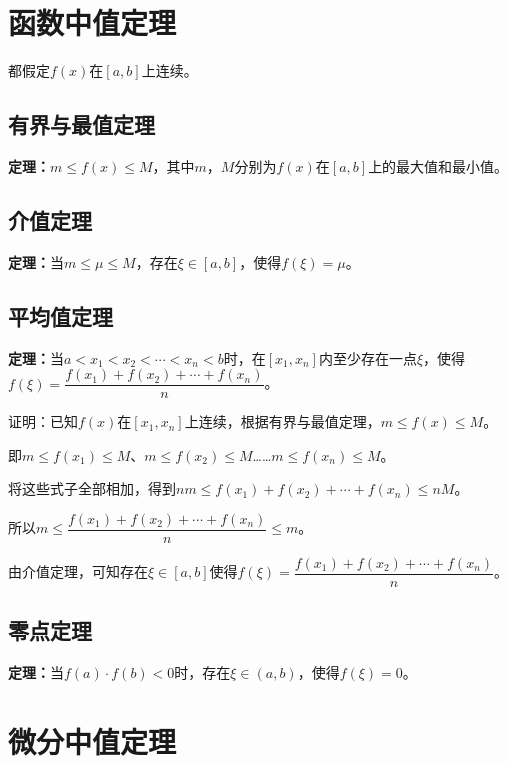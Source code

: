 \documentclass[UTF8, 12pt]{ctexart}
\begin{document}
        \section{函数中值定理}

        都假定$f(x)$在$[a,b]$上连续。

        \subsection{有界与最值定理}

        {\textbf{定理：}}$m\leqslant f(x)\leqslant M$，其中$m$，$M$分别为$f(x)$在$[a,b]$上的最大值和最小值。

        \subsection{介值定理}

        {\textbf{定理：}}当$m\leqslant\mu\leqslant M$，存在$\xi\in[a,b]$，使得$f(\xi)=\mu$。

        \subsection{平均值定理}

        {\textbf{定理：}}当$a<x_1<x_2<\cdots<x_n<b$时，在$[x_1,x_n]$内至少存在一点$\xi$，使得$f(\xi)=\dfrac{f(x_1)+f(x_2)+\cdots+f(x_n)}{n}$。

        证明：已知$f(x)$在$[x_1,x_n]$上连续，根据有界与最值定理，$m\leqslant f(x)\leqslant M$。

        即$m\leqslant f(x_1)\leqslant M$、$m\leqslant f(x_2)\leqslant M$……$m\leqslant f(x_n)\leqslant M$。

        将这些式子全部相加，得到$nm\leqslant f(x_1)+f(x_2)+\cdots+f(x_n)\leqslant nM$。

        所以$m\leqslant\dfrac{f(x_1)+f(x_2)+\cdots+f(x_n)}{n}\leqslant m$。

        由介值定理，可知存在$\xi\in[a,b]$使得$f(\xi)=\dfrac{f(x_1)+f(x_2)+\cdots+f(x_n)}{n}$。

        \subsection{零点定理}

        {\textbf{定理：}}当$f(a)\cdot f(b)<0$时，存在$\xi\in(a,b)$，使得$f(\xi)=0$。

        \section{微分中值定理}
\end{document}
